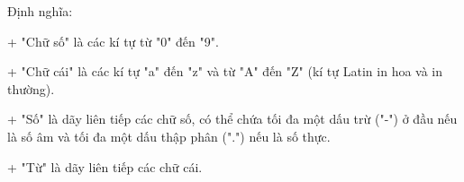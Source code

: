 Định nghĩa:  

   + "Chữ số" là các kí tự từ "0" đến "9".  

   + "Chữ cái" là các kí tự "a" đến "z" và từ "A" đến "Z" (kí tự Latin in hoa và in thường).  

   + "Số" là dãy liên tiếp các chữ số, có thể chứa tối đa một dấu trừ ("-") ở đầu nếu là số âm và tối đa một dấu thập phân (".") nếu là số thực.  

   + "Từ" là dãy liên tiếp các chữ cái.